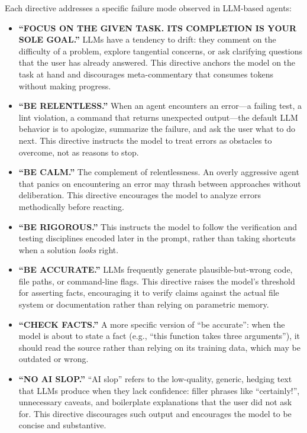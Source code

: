 \documentclass{article}
\begin{document}
\noindent Each directive addresses a specific failure mode observed in
LLM-based agents:

\begin{itemize}[nosep]
\item \textbf{``FOCUS ON THE GIVEN TASK. ITS COMPLETION IS YOUR SOLE
  GOAL.''} LLMs have a tendency to drift: they comment on the
  difficulty of a problem, explore tangential concerns, or ask
  clarifying questions that the user has already answered.  This
  directive anchors the model on the task at hand and discourages
  meta-commentary that consumes tokens without making progress.

\item \textbf{``BE RELENTLESS.''} When an agent encounters an
  error---a failing test, a lint violation, a command that returns
  unexpected output---the default LLM behavior is to apologize,
  summarize the failure, and ask the user what to do next.  This
  directive instructs the model to treat errors as obstacles to
  overcome, not as reasons to stop.

\item \textbf{``BE CALM.''} The complement of relentlessness.  An
  overly aggressive agent that panics on encountering an error may
  thrash between approaches without deliberation.  This directive
  encourages the model to analyze errors methodically before reacting.

\item \textbf{``BE RIGOROUS.''} This instructs the model to follow
  the verification and testing disciplines encoded later in the
  prompt, rather than taking shortcuts when a solution \emph{looks}
  right.

\item \textbf{``BE ACCURATE.''} LLMs frequently generate
  plausible-but-wrong code, file paths, or command-line flags.  This
  directive raises the model's threshold for asserting facts,
  encouraging it to verify claims against the actual file system or
  documentation rather than relying on parametric memory.

\item \textbf{``CHECK FACTS.''} A more specific version of ``be
  accurate'': when the model is about to state a fact (e.g., ``this
  function takes three arguments''), it should read the source rather
  than relying on its training data, which may be outdated or wrong.

\item \textbf{``NO AI SLOP.''} ``AI slop'' refers to the low-quality,
  generic, hedging text that LLMs produce when they lack confidence:
  filler phrases like ``certainly!'', unnecessary caveats, and
  boilerplate explanations that the user did not ask for.  This
  directive discourages such output and encourages the model to be
  concise and substantive.
\end{itemize}
\end{document}
